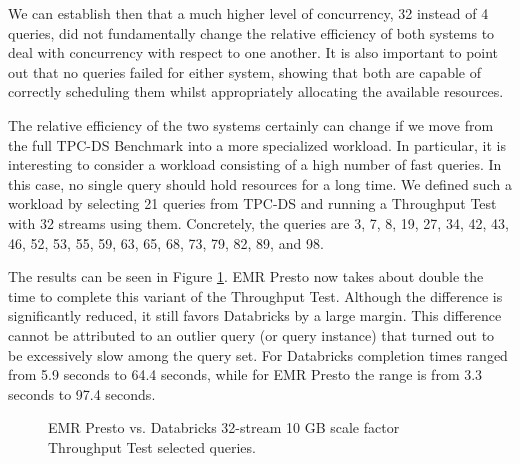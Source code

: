 We can establish then that a much higher level of concurrency, 32 instead of 4 queries, did not fundamentally change the relative efficiency of both systems to deal with concurrency with respect to one another. It is also important to point out that no queries failed for either system, showing that both are capable of correctly scheduling them whilst appropriately allocating the available resources.

The relative efficiency of the two systems certainly can change if we move from the full TPC-DS Benchmark into a more specialized workload. In particular, it is interesting to consider a workload consisting of a high number of fast queries. In this case, no single query should hold resources for a long time. We defined such a workload by selecting 21 queries from TPC-DS and running a Throughput Test with 32 streams using them. Concretely, the queries are 3, 7, 8, 19, 27, 34, 42, 43, 46, 52, 53, 55, 59, 63, 65, 68, 73, 79, 82, 89, and 98.

The results can be seen in Figure \ref{fig:validationExperimentsImpalaKitTputTest}. EMR Presto now takes about double the time to complete this variant of the Throughput Test. Although the difference is significantly reduced, it still favors Databricks by a large margin. This difference cannot be attributed to an outlier query (or query instance) that turned out to be excessively slow among the query set. For Databricks completion times ranged from 5.9 seconds to 64.4 seconds, while for EMR Presto the range is from 3.3 seconds to 97.4 seconds.

\begin{figure}
   \begin{center}
   \end{center}
   \caption{EMR Presto vs. Databricks 32-stream 10 GB scale factor Throughput Test selected queries.}
   \label{fig:validationExperimentsImpalaKitTputTest}
\end{figure}

